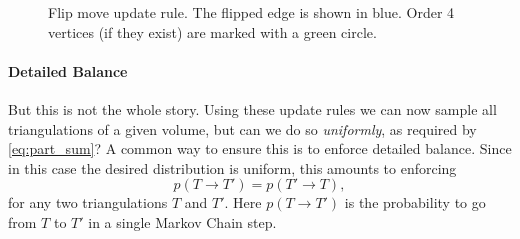 \begin{figure}
    \centering
    \caption{Flip move update rule. The flipped edge is shown in blue. Order 4 vertices (if they exist) are marked with a green circle.}
    \label{fig:flip_move}
\end{figure}

\paragraph{Detailed Balance}
But this is not the whole story. Using these update rules we can now sample all triangulations of a given volume, but can we do so \emph{uniformly}, as required by \eqref{eq:part_sum}? A common way to ensure this is to enforce detailed balance. Since in this case the desired distribution is uniform, this amounts to enforcing
\begin{equation}
    p(T \to T') = p(T' \to T),
\end{equation}
for any two triangulations $T$ and $T'$. Here $p(T \to T')$ is the probability to go from $T$ to $T'$ in a single Markov Chain step.

